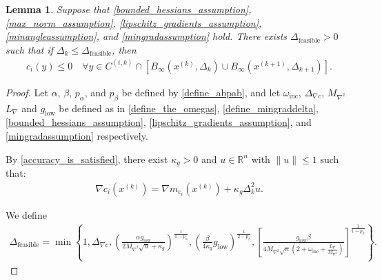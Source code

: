 \documentclass{article}
\newtheorem{lemma}[theorem]{Lemma}
\theoremstyle{case}
\numberwithin{theorem}{subsection}
\newcommand{\dfeas}{{\Delta_{\textrm{feasible}}}}
\newcommand{\dk}{\Delta_k}
\newcommand{\dkpo}{\Delta_{k+1}}
\newcommand{\lipgrad}{{L_{\nabla}}}
\newcommand{\maxhessian}{{M_{\nabla^2}}}
\newcommand{\mingraddelta}{{\Delta_{\nabla c}}}
\newcommand{\mingrad}{{ g_{\textrm{low}} }}
\newcommand{\omegainc}{\omega_{\text{inc}}}
\newcommand{\Rn}{\mathbb R^n}
\newcommand{\tr}{{ B_{\infty}\left(\xk, \dk\right) }}
\newcommand{\trkpo}{{ B_{\infty}\left(\xkpo, \dkpo\right) }}
\newcommand{\xkpo}{{{x}^{(k+1)}}}
\newcommand{\xk}{x^{(k)}}
\newcommand{\fik}{{C^{(i, k)}}}
\begin{document}
\begin{lemma}
\label{each_constraints_cone_is_feasible}
Suppose that 
\cref{bounded_hessians_assumption},
\cref{max_norm_assumption},
\cref{lipschitz_gradients_assumption},
\cref{minangleassumption},
and \cref{mingradassumption} hold.
There exists $\dfeas > 0$ such that
if $\dk \le \dfeas$, then
\begin{align*}
c_i(y) \le 0 \quad \forall y \in \fik \cap \left[\tr \cup \trkpo\right].
\end{align*}
\end{lemma}

\begin{proof}
Let
$\alpha$, $\beta$, $p_{\alpha}$, and $p_{\beta}$
be defined by
\cref{define_abpab},
and let
$\omegainc$,
$\mingraddelta$,
$\maxhessian$
$\lipgrad$
and $\mingrad$
be defined as in
\cref{define_the_omegas},
\cref{define_mingraddelta},
\cref{bounded_hessians_assumption},
\cref{lipschitz_gradients_assumption},
and \cref{mingradassumption}
respectively.

By \cref{accuracy_is_satisfied}, there exist $\kappa_g > 0$ and $u\in\Rn$ with $\|u\|\le 1$ such that:
\begin{align}
\nabla c_i(\xk) = \nabla m_{c_i}(\xk) + \kappa_g\dk^2 u. \label{model_error_for_gradient}
\end{align}

We define
\begin{align}
\dfeas = \min\left\{
1,
\mingraddelta,
\left(\frac{\alpha \mingrad}{2 \maxhessian \sqrt{n} + \kappa_g}\right)^{\frac 1 {1-p_{\alpha}}},
\left(\frac{\beta}{4\kappa_g}\mingrad\right)^{\frac 1 {2 - p_{\beta}}},
\left[\frac {\mingrad  \beta} {4\maxhessian\sqrt{n}\left(2 + \omegainc + \frac {\lipgrad} \maxhessian \right)}\right]^{\frac1 {1 - p_{\beta}} }
\right\}. \label{define_delta_feasible}
\end{align}




\end{proof}
\end{document}
